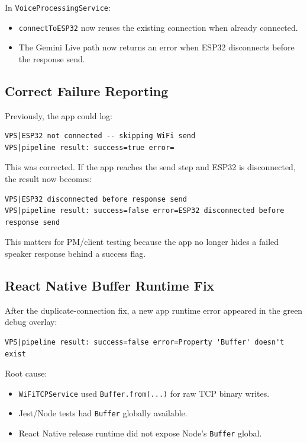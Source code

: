 \documentclass[11pt,a4paper]{article}
\begin{document}
In \texttt{VoiceProcessingService}:

\begin{itemize}[leftmargin=*]
  \item \texttt{connectToESP32} now reuses the existing connection when already connected.
  \item The Gemini Live path now returns an error when ESP32 disconnects before the response send.
\end{itemize}

\subsection{Correct Failure Reporting}

Previously, the app could log:

\begin{lstlisting}[style=logstyle]
VPS|ESP32 not connected -- skipping WiFi send
VPS|pipeline result: success=true error=
\end{lstlisting}

This was corrected. If the app reaches the send step and ESP32 is disconnected, the result now becomes:

\begin{lstlisting}[style=logstyle]
VPS|ESP32 disconnected before response send
VPS|pipeline result: success=false error=ESP32 disconnected before response send
\end{lstlisting}

This matters for PM/client testing because the app no longer hides a failed speaker response behind a success flag.

\subsection{React Native Buffer Runtime Fix}

After the duplicate-connection fix, a new app runtime error appeared in the green debug overlay:

\begin{lstlisting}[style=logstyle]
VPS|pipeline result: success=false error=Property 'Buffer' doesn't exist
\end{lstlisting}

Root cause:

\begin{itemize}[leftmargin=*]
  \item \texttt{WiFiTCPService} used \texttt{Buffer.from(...)} for raw TCP binary writes.
  \item Jest/Node tests had \texttt{Buffer} globally available.
  \item React Native release runtime did not expose Node's \texttt{Buffer} global.
\end{itemize}
\end{document}
